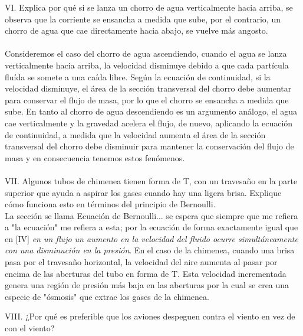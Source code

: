 \documentclass{article}
\begin{document}
\noindent VI. Explica por qué si se lanza un chorro de agua verticalmente hacia arriba, se observa que la corriente se ensancha a medida que sube, por el contrario, un chorro de agua que cae directamente hacia abajo, se vuelve más angosto. \\\\

Consideremos el caso del chorro de agua ascendiendo, cuando el agua se lanza verticalmente hacia arriba, la velocidad disminuye debido a que cada partícula fluída se somete a una caída libre. Según la ecuación de continuidad, si la velocidad disminuye, el área de la sección transversal del chorro debe aumentar para conservar el flujo de masa, por lo que el chorro se ensancha a medida que sube. En tanto al chorro de agua descendiendo es un argumento análogo, el agua cae verticalmente y la gravedad acelera el flujo, de nuevo, aplicando la ecuación de continuidad, a medida que la velocidad aumenta el área de la sección transversal del chorro debe disminuir para mantener la conservación del flujo de masa y en consecuencia tenemos estos fenómenos. \\\\

\noindent VII. Algunos tubos de chimenea tienen forma de T, con un travesaño en la parte superior que ayuda a aspirar los gases cuando hay una ligera brisa. Explique cómo funciona esto en términos del principio de Bernoulli. \\

La sección se llama Ecuación de Bernoulli... se espera que siempre que me refiera a "la ecuación" me refiera a esta; por la ecuación de forma exactamente igual que en [IV] \textit{en un flujo un aumento en la velocidad del fluido ocurre simultáneamente con una disminución en la presión}. En el caso de la chimenea, cuando una brisa pasa por el travesaño horizontal, la velocidad del aire aumenta al pasar por encima de las aberturas del tubo en forma de T. Esta velocidad incrementada genera una región de presión más baja en las aberturas por la cual se crea una especie de "ósmosis" que extrae los gases de la chimenea.

\noindent VIII. ¿Por qué es preferible que los aviones despeguen contra el viento en vez de con el viento? \\
\end{document}
